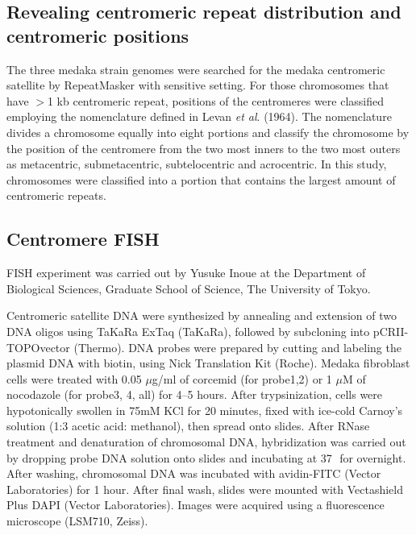 \subsection*{Revealing centromeric repeat distribution and centromeric positions}
  The three medaka strain genomes were searched for the medaka centromeric satellite by RepeatMasker with sensitive setting. For those chromosomes that have $>$1 kb centromeric repeat, positions of the centromeres were classified employing the nomenclature defined in Levan \textit{et al}. (1964). The nomenclature divides a chromosome equally into eight portions and classify the chromosome by the position of the centromere from the two most inners to the two most outers as metacentric, submetacentric, subtelocentric and acrocentric. In this study, chromosomes were classified into a portion that contains the largest amount of centromeric repeats.


\subsection*{Centromere FISH}
  FISH experiment was carried out by Yusuke Inoue at the Department of Biological Sciences, Graduate School of Science, The University of Tokyo.

  Centromeric satellite DNA were synthesized by annealing and extension of two DNA oligos using TaKaRa ExTaq (TaKaRa), followed by subcloning into pCR\texttrademark II-TOPO\textregistered vector (Thermo). DNA probes were prepared by cutting and labeling the plasmid DNA with biotin, using Nick Translation Kit (Roche). Medaka fibroblast cells were treated with 0.05 $\mu$g/ml of corcemid (for probe1,2) or 1 $\mu$M of nocodazole (for probe3, 4, all) for 4--5 hours. After trypsinization, cells were hypotonically swollen in 75mM KCl for 20 minutes, fixed with ice-cold Carnoy's solution (1:3 acetic acid: methanol), then spread onto slides. After RNase treatment and denaturation of chromosomal DNA, hybridization was carried out by dropping probe DNA solution onto slides and incubating at 37\,\celsius\, for overnight. After washing, chromosomal DNA was incubated with avidin-FITC (Vector Laboratories) for 1 hour. After final wash, slides were mounted with Vectashield Plus DAPI (Vector Laboratories). Images were acquired using a fluorescence microscope (LSM710, Zeiss).



